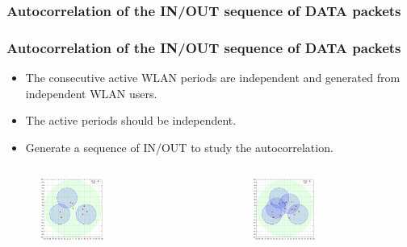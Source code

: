\documentclass[9pt,handout,serif]{beamer}
\begin{document}
\subsubsection*{Autocorrelation of the IN/OUT sequence of DATA packets}

\begin{frame}[c]
	\frametitle{Autocorrelation of the IN/OUT sequence of DATA packets}
	\begin{itemize}
		\item The consecutive active WLAN periods are independent and generated from independent WLAN users.
		\item The active periods should be independent.
		\item Generate a sequence of IN/OUT to study the autocorrelation.
	\end{itemize}
	
	\begin{columns}
		\begin{figure}
			\centering
			\includegraphics[width=0.5\textwidth]{../images/results/autocorrelation/localview/8sessions}
		\end{figure}
		\begin{figure}
			\centering
			\includegraphics[width=0.5\textwidth]{../images/results/autocorrelation/localview/15sessions}
		\end{figure}
		

\end{columns}
\end{frame}
\end{document}
